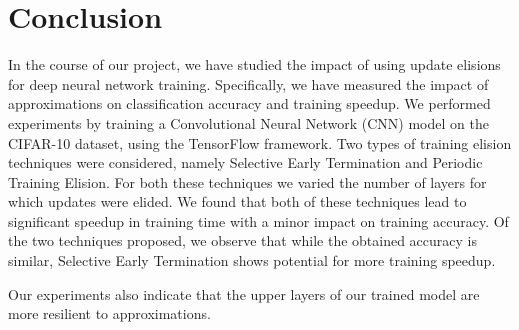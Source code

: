 \section{Conclusion}
In the course of our project, we have studied the impact of using update elisions for deep neural network training. Specifically, we have measured the impact of approximations on classification accuracy and training speedup. We performed experiments by training a Convolutional Neural Network (CNN) model on the CIFAR-10 dataset, using the TensorFlow framework. Two types of training elision techniques were considered, namely Selective Early Termination and Periodic Training Elision. For both these techniques we varied the number of layers for which updates were elided. We found that both of these techniques lead to significant speedup in training time with a minor impact on training accuracy.  Of the two techniques proposed, we observe that while the obtained accuracy is similar, Selective Early Termination shows potential for more training speedup.

Our experiments also indicate that the upper layers of our trained model are more resilient to approximations.